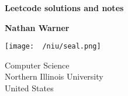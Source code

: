 \documentclass{report}
\title{\Huge{}}
\author{\huge{Nathan Warner}}
\date{\huge{}}
\begin{document}
        \begin{titlepage}
       \begin{center}
           \vspace*{1cm}
    
           \textbf{Leetcode solutions and notes }
    
           \vspace{0.5cm}
            
                
           \vspace{1.5cm}
    
           \textbf{Nathan Warner}
    
           \vfill
                
                
           \vspace{0.8cm}
         
           \texttt{[image: ~/niu/seal.png]}
                
           Computer Science \\
           Northern Illinois University\\
           United States\\
           
                
       \end{center}
    \end{titlepage}
    \tableofcontents
    \pagebreak 
    \bigbreak \noindent 
\end{document}

